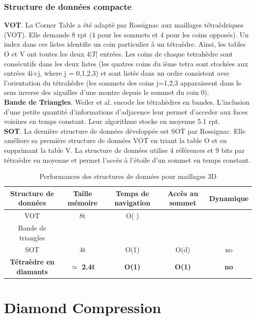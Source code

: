 \documentclass[a4paper,11pt,openany]{article}
\begin{document}
\subsubsection{Structure de données compacte}
\noindent
\textbf{VOT}. La Corner Table a été adapté par Rossignac aux maillages tétraèdriques (VOT). Elle demande 8 rpt (4 pour les sommets et 4 pour les coins opposés). Un index dans ces listes identifie un coin particulier à un tétraèdre. Ainsi, les tables O et V ont toutes les deux $4|T|$ entrées. Les coins de chaque tetrahèdre sont consécutifs dans les deux listes (les quatres coins du ième tetra sont stockées aux entrées  4i+j, where j = 0,1,2,3) et sont listés dans un ordre consistent avec l'orientation du tétrahèdre (les sommets des coins j=1,2,3 apparaissent dans le sens inverse des aiguilles d'une montre depuis le sommet du coin 0).\\
\textbf{Bande de Triangles}. Weiler et al. \cite{triangle_strips_weiler} encode les tétrahèdres en bandes. L'inclusion d'une petite quantité d'informations d'adjacence leur permet d'acceder aux faces voisines en temps constant. Leur algorithme stocke en moyenne 5.1 rpt.\\
\textbf{SOT}. La dernière structure de données développée est SOT \cite{SOT} par Rossignac. Elle améliore sa première structure de données VOT en triant la table O et en supprimant la table V. La structure de données utilise 4 références et 9 bits par tétraèdre en moyenne et permet l'accès à l'étoile d'un sommet en temps constant.

\begin{table}[H]
\footnotesize
\begin{tabular}{|c | c | c | c | c|}
\hline
Structure de données & Taille mémoire & Temps de navigation & Accès au sommet & Dynamique\\
\hline
VOT & 8t & O( )& & \\
Bande de triangles \cite{triangle_strips_weiler} & & & &\\
SOT & 4t & O(1) & O(d)  & no\\
\textbf{Tétraèdre en diamants} & \textbf{$\simeq$ 2.4t} & \textbf{O(1)} & \textbf{O(1)} & \textbf{no} \\
\hline  
\end{tabular}
\caption{Performances des structures de données pour maillages 3D}
\end{table}

\section{Diamond Compression}
\end{document}
